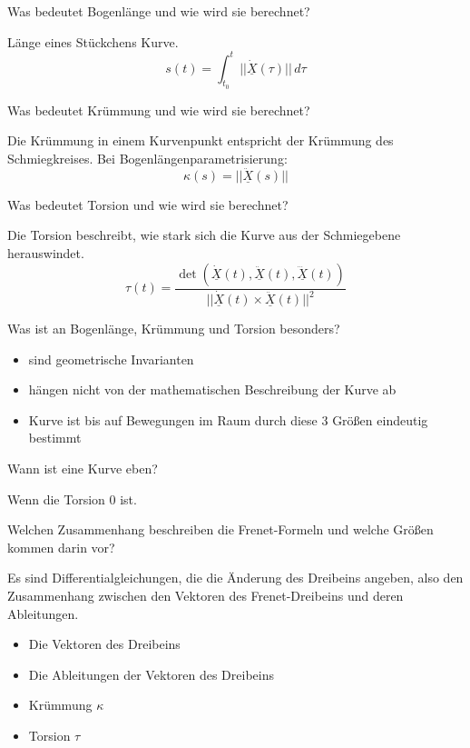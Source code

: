 \documentclass[twocolumn, fontsize=8pt, DIV=1]{scrartcl}
\begin{document}
\begin{framed}
    Was bedeutet Bogenlänge und wie wird sie berechnet?
\end{framed}
Länge eines Stückchens Kurve.
\[
    s(t) = \int_{t_0}^t ||\underline{\dot{X}}(\tau)||\, d\tau
\]



\begin{framed}
    Was bedeutet Krümmung und wie wird sie berechnet?
\end{framed}
Die Krümmung in einem Kurvenpunkt entspricht der Krümmung des Schmiegkreises. 
Bei Bogenlängenparametrisierung:
\[
    \kappa(s) = ||\underline{\ddot{X}}(s)||
\]



\begin{framed}
    Was bedeutet Torsion und wie wird sie berechnet?
\end{framed}
Die Torsion beschreibt, wie stark sich die Kurve aus der Schmiegebene herauswindet.
\[
    \tau(t) = \frac{\det(\underline{\dot{X}}(t), \underline{\ddot{X}}(t), \underline{\dddot{X}}(t))}{||\underline{\dot{X}}(t) \times \underline{\ddot{X}}(t)||^2}
\]



\begin{framed}
    Was ist an Bogenlänge, Krümmung und Torsion besonders?
\end{framed}
\begin{itemize}
    \item sind geometrische Invarianten
    \item hängen nicht von der mathematischen Beschreibung der Kurve ab
    \item Kurve ist bis auf Bewegungen im Raum durch diese 3 Größen eindeutig bestimmt
\end{itemize}



\begin{framed}
    Wann ist eine Kurve eben?
\end{framed}
Wenn die Torsion $0$ ist.



\begin{framed}
    Welchen Zusammenhang beschreiben die Frenet-Formeln und welche Größen kommen darin vor?
\end{framed}
Es sind Differentialgleichungen, die die Änderung des Dreibeins angeben, also den Zusammenhang zwischen den Vektoren des Frenet-Dreibeins und deren Ableitungen.
\begin{itemize}
    \item Die Vektoren des Dreibeins
    \item Die Ableitungen der Vektoren des Dreibeins
    \item Krümmung $\kappa$
    \item Torsion $\tau$
\end{itemize}
\end{document}
